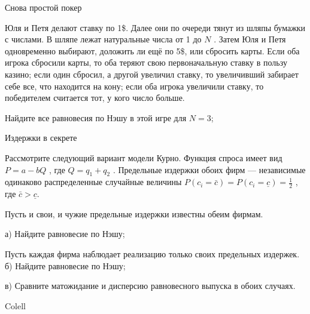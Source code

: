 \begin{problem}
 Снова простой покер\par
Юля и Петя делают ставку по 1\$. Далее они по очереди тянут из шляпы бумажки с числами. В шляпе лежат натуральные числа от 1 до  $N$ . Затем Юля и Петя одновременно выбирают, доложить ли ещё по 5\$, или сбросить карты. Если оба игрока сбросили карты, то оба теряют свою первоначальную ставку в пользу казино; если один сбросил, а другой увеличил ставку, то увеличивший забирает себе все, что находится на кону; если оба игрока увеличили ставку, то победителем считается тот, у кого число больше.\par
Найдите все равновесия по Нэшу в этой игре для  $N=3$;\par



\begin{sol}

\end{sol}
\end{problem}



\begin{problem}
 Издержки в секрете \par
Рассмотрите следующий вариант модели Курно. Функция спроса имеет вид  $P=a-bQ$ , где  $Q=q_{1} +q_{2} $ . Предельные издержки обоих фирм — независимые одинаково распределенные случайные величины  $P\left(c_{i} =\bar{c}\right)=P\left(c_{i} =\underline{c}\right)=\frac{1}{2} $ , где  $\bar{c}>\underline{c}$.\par
Пусть и свои, и чужие предельные издержки известны обеим фирмам.\par
а)	Найдите равновесие по Нэшу;\par
Пусть каждая фирма наблюдает реализацию только своих предельных издержек.
б)	Найдите равновесие по Нэшу;\par
в)	Сравните матожидание и дисперсию равновесного выпуска в обоих случаях.\par



\begin{sol}

\end{sol}
\end{problem}


\begin{source}
Colell
\end{source}



